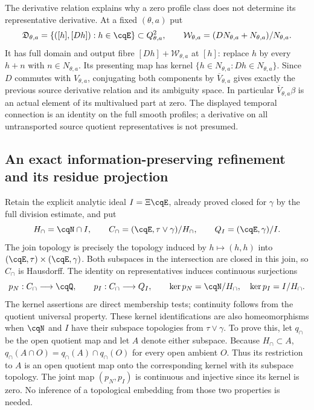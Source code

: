 The derivative relation explains why a zero profile class does not
determine its representative derivative. At a fixed $(\theta,a)$ put
\[
 \mathfrak D_{\theta,a}
 =\{([h],[Dh]):h\in\cqE\}\subset Q_{\theta,a}^2,\qquad
 \mathcal W_{\theta,a}
 =(DN_{\theta,a}+N_{\theta,a})/N_{\theta,a}.
\]
It has full domain and output fibre $[Dh]+\mathcal W_{\theta,a}$
at $[h]$: replace $h$ by every $h+n$ with $n\in N_{\theta,a}$.
Its presenting map has kernel
$\{h\in N_{\theta,a}:Dh\in N_{\theta,a}\}$.
Since $D$ commutes with $V_{\theta,a}$, conjugating both components
by $\overline V_{\theta,a}$ gives exactly the previous source
derivative relation and its ambiguity space. In particular
$\overline V_{\theta,a}\beta$ is an actual element of its
multivalued part at zero. The displayed temporal connection is an
identity on the full smooth profiles; a derivative on all
untransported source quotient representatives is not presumed.

\subsection{An exact information-preserving refinement and its residue projection}

Retain the explicit analytic ideal $I=\Xi\cqE$, already proved closed
for $\gamma$ by the full division estimate, and put
\begin{equation}
 H_\cap=\cqN\cap I,\qquad
 C_\cap=(\cqE,\tau\vee\gamma)/H_\cap,\qquad
 Q_I=(\cqE,\gamma)/I .
 \label{eq:cq-flow-meet-quotient}
\end{equation}
The join topology is precisely the topology induced by
$h\mapsto(h,h)$ into $(\cqE,\tau)\times(\cqE,\gamma)$.
Both subspaces in the intersection are closed in this join, so
$C_\cap$ is Hausdorff. The identity on representatives induces
continuous surjections
\begin{equation}
 p_N:C_\cap\longrightarrow\cqQ,\qquad
 p_I:C_\cap\longrightarrow Q_I,\qquad
 \ker p_N=\cqN/H_\cap,\quad
 \ker p_I=I/H_\cap .
 \label{eq:cq-flow-meet-maps}
\end{equation}
The kernel assertions are direct membership tests; continuity follows
from the quotient universal property. These kernel identifications
are also homeomorphisms when $\cqN$ and $I$ have their subspace
topologies from $\tau\vee\gamma$. To prove this, let $q_\cap$ be
the open quotient map and let $A$ denote either subspace.
Because $H_\cap\subset A$,
$q_\cap(A\cap O)=q_\cap(A)\cap q_\cap(O)$ for every open ambient
$O$. Thus its restriction to $A$ is an open quotient map onto
the corresponding kernel with its subspace topology.
The joint map $(p_N,p_I)$ is continuous and injective since its
kernel is zero. No inference of a topological embedding from those
two properties is needed.

